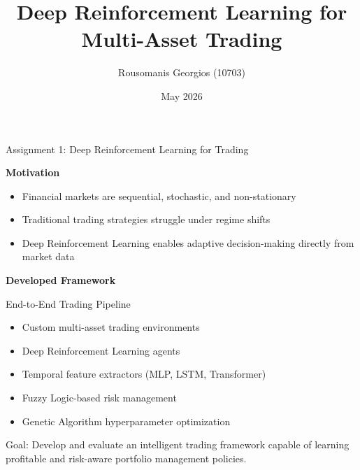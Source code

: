 \documentclass[10pt]{beamer}
\title[DRL Trading Framework]{Deep Reinforcement Learning for Multi-Asset Trading}
\author{Rousomanis Georgios (10703)}
\date{May 2026}
\begin{document}
\begin{frame}
\titlepage
\end{frame}

\begin{frame}{Assignment 1: Deep Reinforcement Learning for Trading}

\textbf{Motivation}

\vspace{0.2cm}

\begin{itemize}
    \item Financial markets are sequential, stochastic, and non-stationary
    \item Traditional trading strategies struggle under regime shifts
    \item Deep Reinforcement Learning enables adaptive decision-making directly from market data
\end{itemize}

\vspace{0.4cm}

\textbf{Developed Framework}

\vspace{0.2cm}

\begin{block}{End-to-End Trading Pipeline}
\begin{itemize}
    \item Custom multi-asset trading environments
    \item Deep Reinforcement Learning agents
    \item Temporal feature extractors (MLP, LSTM, Transformer)
    \item Fuzzy Logic-based risk management
    \item Genetic Algorithm hyperparameter optimization
\end{itemize}
\end{block}

\vspace{0.2cm}

\begin{center}
\small
Goal: Develop and evaluate an intelligent trading framework capable of
learning profitable and risk-aware portfolio management policies.
\end{center}

\end{frame}
\end{document}
